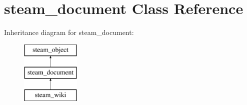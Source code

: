 \hypertarget{classsteam__document}{
\section{steam\_\-document Class Reference}
\label{classsteam__document}
}
Inheritance diagram for steam\_\-document:\begin{figure}[H]
\begin{center}
\leavevmode
\includegraphics[height=3.000000cm]{classsteam__document}
\end{center}
\end{figure}
